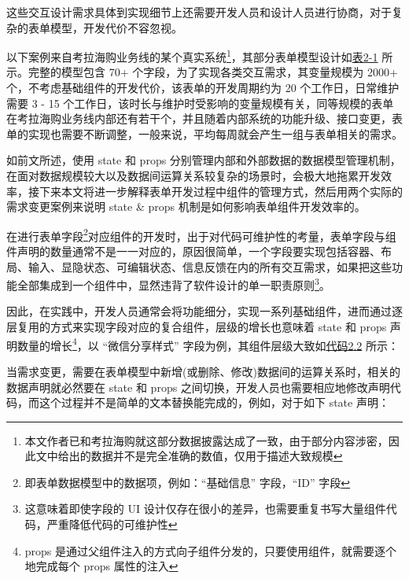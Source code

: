 \documentclass[winfonts,master,twoside]{njuthesis}
\begin{document}
这些交互设计需求具体到实现细节上还需要开发人员和设计人员进行协商，对于复杂的表单模型，开发代价不容忽视。



以下案例来自考拉海购业务线的某个真实系统\footnote{本文作者已和考拉海购就这部分数据披露达成了一致，由于部分内容涉密，因此文中给出的数据并不是完全准确的数值，仅用于描述大致规模}，其部分表单模型设计如\hyperref[kaola-activity-configuration-form-model]{表2-1} 所示。完整的模型包含 70+ 个字段，为了实现各类交互需求，其变量规模为 2000+ 个，不考虑基础组件的开发代价，该表单的开发周期约为 20 个工作日，日常维护需要 3 - 15 个工作日，该时长与维护时受影响的变量规模有关，同等规模的表单在考拉海购业务线内部还有若干个，并且随着内部系统的功能升级、接口变更，表单的实现也需要不断调整，一般来说，平均每周就会产生一组与表单相关的需求。

如前文所述，使用 state 和 props 分别管理内部和外部数据的数据模型管理机制，在面对数据规模较大以及数据间运算关系较复杂的场景时，会极大地拖累开发效率，接下来本文将进一步解释表单开发过程中组件的管理方式，然后用两个实际的需求变更案例来说明 state \& props 机制是如何影响表单组件开发效率的。

在进行表单字段\footnote{即表单数据模型中的数据项，例如：“基础信息” 字段，“ID” 字段}对应组件的开发时，出于对代码可维护性的考量，表单字段与组件声明的数量通常不是一一对应的，原因很简单，一个字段要实现包括容器、布局、输入、显隐状态、可编辑状态、信息反馈在内的所有交互需求，如果把这些功能全部集成到一个组件中，显然违背了软件设计的单一职责原则\cite{martin2003agile}\footnote{这意味着即使字段的 UI 设计仅存在很小的差异，也需要重复书写大量组件代码，严重降低代码的可维护性}。

因此，在实践中，开发人员通常会将功能细分，实现一系列基础组件，进而通过逐层复用的方式来实现字段对应的复合组件，层级的增长也意味着 state 和 props 声明数量的增长\footnote{props 是通过父组件注入的方式向子组件分发的，只要使用组件，就需要逐个地完成每个 props 属性的注入}，以 “微信分享样式” 字段为例，其组件层级大致如\hyperref[weixin-share-style]{代码2.2} 所示：



当需求变更，需要在表单模型中新增(或删除、修改)数据间的运算关系时，相关的数据声明就必然要在 state 和 props 之间切换，开发人员也需要相应地修改声明代码，而这个过程并不是简单的文本替换能完成的，例如，对于如下 state 声明：


\end{document}

